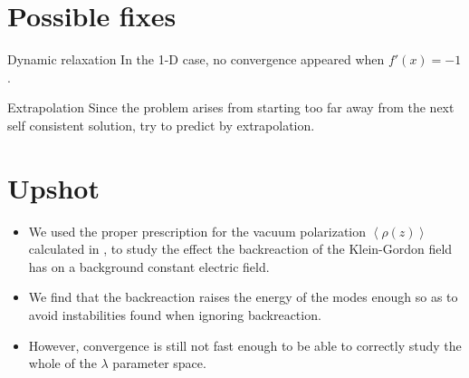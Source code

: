 \section*{Possible fixes}

\begin{frame}{Dynamic relaxation}
	In the 1-D case, no convergence appeared when $f'(x) = -1$.

	
\end{frame}

\begin{frame}{Extrapolation}
Since the problem arises from starting too far away from the next self consistent solution, try to predict by extrapolation.

\end{frame}

\section{Upshot}

\begin{frame}
	\begin{itemize}
		\item We used the proper prescription for the vacuum polarization $ \left<\rho(z) \right>$ calculated in \cite{Wern2020}, to study the effect the backreaction of the Klein-Gordon field has on a background constant electric field. 
		\item We find that the backreaction raises the energy of the modes enough so as to avoid instabilities found when ignoring backreaction.
		\item However, convergence is still not fast enough to be able to correctly study the whole of the $\lambda$ parameter space.
	\end{itemize}
\end{frame}

